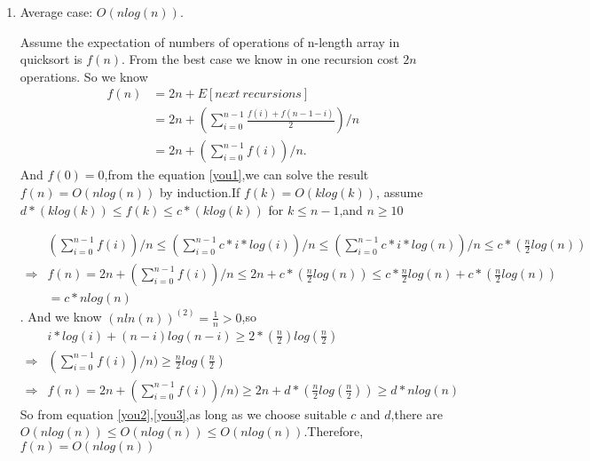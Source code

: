 \documentclass[12pt,a4paper]{article}
\makeatletter
\newtheorem*{solution}{Solution}
\theoremstyle{definition}
\renewenvironment{solution}[1][Solution] {\par\pushQED{\qed}\normalfont\topsep6\p@\@plus6\p@\relax\trivlist\item[\hskip\labelsep\bfseries#1\@addpunct{.}]\ignorespaces}{\popQED\endtrivlist\@endpefalse} \makeatother
\makeatother
\begin{document}
\begin{enumerate}
\begin{solution}
    Average case: $O(nlog(n))$.\par
    Assume the expectation of numbers of operations of n-length array in quicksort is $f(n)$.
    From the best case we know in one recursion cost $2n$ operations. So we know 
    \begin{equation}
    \begin{aligned}
        f(n)&=2n+E[next~recursions]\\&=2n+(\sum_{i=0}^{n-1}\frac{f(i)+f(n-1-i)}{2})/n\\&=2n+(\sum_{i=0}^{n-1}f(i))/n.
        \end{aligned}
        \label{you1}
    \end{equation}
    And $f(0)=0$,from the equation \ref{you1},we can solve the result $f(n)=O(nlog(n))$ by induction.If $f(k)=O(klog(k))$, assume $d*(klog(k))\leq f(k)\leq c*(klog(k))$  for $k\leq n-1$,and $n\geq 10$
    
    \begin{equation}
    \begin{aligned}
        &(\sum_{i=0}^{n-1}f(i))/n\leq(\sum_{i=0}^{n-1}c*i*log(i))/n\leq(\sum_{i=0}^{n-1}c*i*log(n))/n\leq c*(\frac{n}{2}log(n)) \\
        \Rightarrow &f(n)=2n+(\sum_{i=0}^{n-1}f(i))/n\leq 2n+c*(\frac{n}{2}log(n))\leq c*\frac{n}{2}log(n)+c*(\frac{n}{2}log(n))\\&=c*nlog(n)
    \end{aligned}
    \label{you2}
    \end{equation}.
    And we know $(nln(n))^{(2)}=\frac{1}{n}>0$,so 
    \begin{equation}
    \begin{aligned}
        &i*log(i)+(n-i)log(n-i)\geq 2*(\frac{n}{2})log(\frac{n}{2})\\
        \Rightarrow&(\sum_{i=0}^{n-1}f(i))/n)\geq \frac{n}{2}log(\frac{n}{2})
        \\
        \Rightarrow&f(n)=2n+(\sum_{i=0}^{n-1}f(i))/n)\geq 2n+d*(\frac{n}{2}log(\frac{n}{2}))\geq d*nlog(n)
    \end{aligned}
    \label{you3}
    \end{equation}
    So from equation \ref{you2},\ref{you3},as long as we choose suitable $c$ and $d$,there are $O(nlog(n))\leq O(nlog(n))\leq O(nlog(n))$.Therefore, $f(n)=O(nlog(n))$
    

\end{solution}
\end{enumerate}
\end{document}

